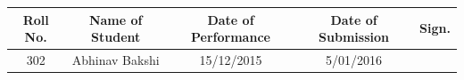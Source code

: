 \documentclass[a4paper,12pt]{article}
\begin{document}
\begin{center}
\newpage	
	\begin{tabular}
		{|c|c|c|c|c|}\hline
		{\bf Roll No.}		&{\bf Name of Student}	&{\bf Date of Performance}  				&{\bf Date of Submission}	&{\bf Sign.}  \\    \hline
		302	& Abhinav Bakshi & 15/12/2015	& 	5/01/2016	&  \\ \hline
	\end{tabular}\\ 
\end{center}	
\end{document}
